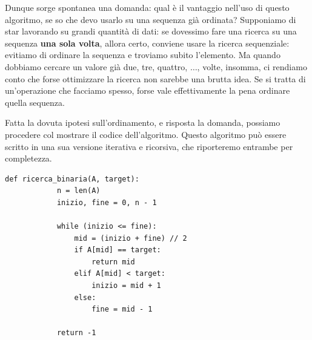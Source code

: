 \documentclass[12pt]{report}
\begin{document}
    Dunque sorge spontanea una domanda: qual è il vantaggio nell’uso di questo algoritmo, se so che devo usarlo su una sequenza già ordinata?
    Supponiamo di star lavorando su grandi quantità di dati: se dovessimo fare una ricerca su una sequenza \textbf{una sola volta}, allora certo, conviene usare la ricerca sequenziale: evitiamo di ordinare la sequenza e troviamo subito l’elemento. Ma quando dobbiamo cercare un valore già due, tre, quattro, $\dots$, volte, insomma, ci rendiamo conto che forse ottimizzare la ricerca non sarebbe una brutta idea. Se si tratta di un’operazione che facciamo spesso, forse vale effettivamente la pena ordinare quella sequenza.
    		
    Fatta la dovuta ipotesi sull’ordinamento, e risposta la domanda, possiamo procedere col mostrare il codice dell’algoritmo. Questo algoritmo può essere scritto in una sua versione iterativa e ricorsiva, che riporteremo entrambe per completezza.
    		
    \begin{lstlisting}[caption={Versione iterativa della ricerca binaria}]
    	def ricerca_binaria(A, target):
    		n = len(A)
    		inizio, fine = 0, n - 1
    		
    		while (inizio <= fine):
    			mid = (inizio + fine) // 2
    			if A[mid] == target:
    				return mid
    			elif A[mid] < target:
    				inizio = mid + 1
    			else:
    				fine = mid - 1
    		
    		return -1
    \end{lstlisting}
    		
\end{document}
